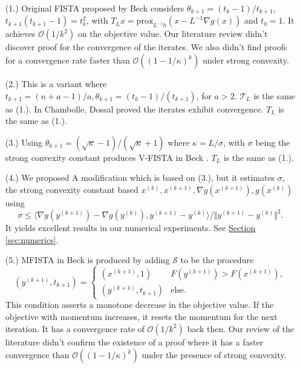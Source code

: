 \documentclass[]{article}
\theoremstyle{definition}
\numberwithin{equation}{subsection}
\begin{document}
        \begin{itemize}
            \item [(1.)] 
                Original FISTA proposed by Beck \cite{beck_fast_2009-1} considers $\theta_{k + 1} = (t_k - 1)/t_{k + 1}$, $t_{k + 1}(t_{k + 1} - 1) = t_{k}^2$, with $T_L x = \text{prox}_{L^{-1}h}(x  - L^{-1}\nabla g(x))$ and $t_0 = 1$. 
            It achieves $\mathcal O(1/k^2)$ on the objective value. 
            Our literature review didn't discover proof for the convergence of the iterates. We also didn't find proofs for a convergence rate faster than $\mathcal O((1 - 1/\kappa)^k)$ under strong convexity. 
            \item [(2.)] 
                This is a variant where $t_{k + 1} = (n + a - 1)/a, \theta_{k + 1} = (t_{k} - 1)/(t_{k + 1})$, for $a > 2$. $\mathcal T_L$ is the same as (1.). 
            In \cite[Theorem 4.1]{chambolle_convergence_2015} Chambolle, Dossal proved the iterates exhibit  convergence. $T_L$ is the same as (1.). 
            \item [(3.)] 
                Using $\theta_{k + 1} = (\sqrt{\kappa} - 1)/(\sqrt{\kappa} + 1)$ where $\kappa = L/\sigma$, with $\sigma$ being the strong convexity constant produces V-FISTA in Beck \cite[10.7.7]{beck_first-order_nodate}\cite[3.3]{noel_nesterovs_nodate}. $T_L$ is the same as (1.). 
            \item [(4.)] 
                We proposed A modification which is based on (3.), but it estimates $\sigma$, the strong convexity constant based $x^{(k)}, x^{(k + 1)}, \nabla g(x^{(k + 1)}), g(x^{(k)})$ using 
                \[
                    \sigma \le \langle \nabla g(y^{(k + 1)}) - \nabla g(y^{(k)}), y^{(k + 1)} - y^{(k)}\rangle/ 
                    \Vert y^{(k + 1)} - y^{(k)}\Vert^2. 
                \]
            It yields excellent results in our numerical experiments. See \hyperref[sec:numerics]{Section \ref*{sec:numerics}}. 
            \item [(5.)] 
                MFISTA in Beck\cite{beck_fast_2009} is produced by adding $\mathcal S$ to be the procedure
                \[
                    (y^{(k + 1)}, t_{k + 1}) = \begin{cases}
                        (x^{(k + 1)}, 1) & F(y^{(k + 1)}) > F(x^{(k + 1)}),
                        \\
                        (y^{(k + 1)}, t_{k + 1}) & \text{else}. 
                    \end{cases}
                \]
                This condition asserts a monotone decrease in the objective value. If the objective with momentum increases, it resets the momentum for the next iteration.  It has a convergence rate of $\mathcal O(1/k^2)$ back then. Our review of the literature didn't confirm the existence of a proof where it has a faster convergence than $\mathcal O((1 - 1/\kappa)^k)$ under the presence of strong convexity. 
        \end{itemize}
\end{document}
